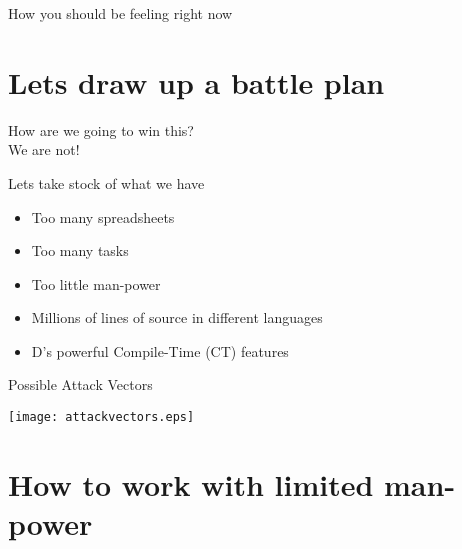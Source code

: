 \documentclass[aspectratio=169,notes]{beamer}
\begin{document}
	\begin{frame}{How you should be feeling right now}
		\begin{center}
		\end{center}
	\end{frame}

	\section{Lets draw up a battle plan}

	\begin{frame}{\mbox{}}
		\begin{center}
			\huge
			How are we going to win this?\\[2cm]
			\pause
			We are not!
		\end{center}
	\end{frame}

	\begin{frame}{Lets take stock of what we have}
		\begin{itemize}
			\item Too many spreadsheets \pause \CheckmarkBold
			\item Too many tasks \pause \CheckmarkBold
			\item Too little man-power \pause \CheckmarkBold
			\item Millions of lines of source in different languages \pause \CheckmarkBold
			\item D's powerful Compile-Time (CT) features \pause \CheckmarkBold
		\end{itemize}
	\end{frame}

	\begin{frame}{Possible Attack Vectors}
		\begin{center}
		\texttt{[image: attackvectors.eps]}
		\end{center}
	\end{frame}

	\section{How to work with limited man-power}
\end{document}
